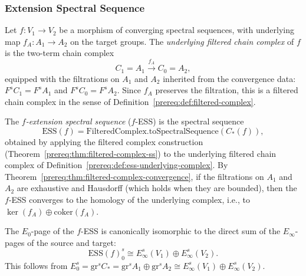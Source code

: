 \subsubsection{Extension Spectral Sequence}\label{sec:prereq-ess}

\begin{definition}\label{prereq:def:ess-underlying-complex}
    Let $f: V_1 \to V_2$ be a morphism of converging spectral sequences, with underlying map $f_A: A_1 \to A_2$ on the target groups. The \emph{underlying filtered chain complex} of $f$ is the two-term chain complex
    $$C_1 = A_1 \xrightarrow{f_A} C_0 = A_2,$$
    equipped with the filtrations on $A_1$ and $A_2$ inherited from the convergence data: $F^s C_1 = F^s A_1$ and $F^s C_0 = F^s A_2$. Since $f_A$ preserves the filtration, this is a filtered chain complex in the sense of Definition~\ref{prereq:def:filtered-complex}.
\end{definition}

\begin{definition}\label{prereq:def:ess}
    \leanok
    The \emph{$f$-extension spectral sequence} ($f$-ESS) is the spectral sequence
    $$\mathrm{ESS}(f) = \mathrm{FilteredComplex.toSpectralSequence}(C_*(f)),$$
    obtained by applying the filtered complex construction (Theorem~\ref{prereq:thm:filtered-complex-ss}) to the underlying filtered chain complex of Definition~\ref{prereq:def:ess-underlying-complex}. By Theorem~\ref{prereq:thm:filtered-complex-convergence}, if the filtrations on $A_1$ and $A_2$ are exhaustive and Hausdorff (which holds when they are bounded), then the $f$-ESS converges to the homology of the underlying complex, i.e., to $\ker(f_A) \oplus \mathrm{coker}(f_A)$.
\end{definition}

\begin{proposition}\label{prereq:prop:ess-e0-iso}
    \leanok
    The $E_0$-page of the $f$-ESS is canonically isomorphic to the direct sum of the $E_\infty$-pages of the source and target:
    $$\mathrm{ESS}(f)_0^{s} \cong E_\infty^{s}(V_1) \oplus E_\infty^{s}(V_2).$$
    This follows from $E_0^s = \mathrm{gr}^s C_* = \mathrm{gr}^s A_1 \oplus \mathrm{gr}^s A_2 \cong E_\infty^s(V_1) \oplus E_\infty^s(V_2)$.
\end{proposition}

